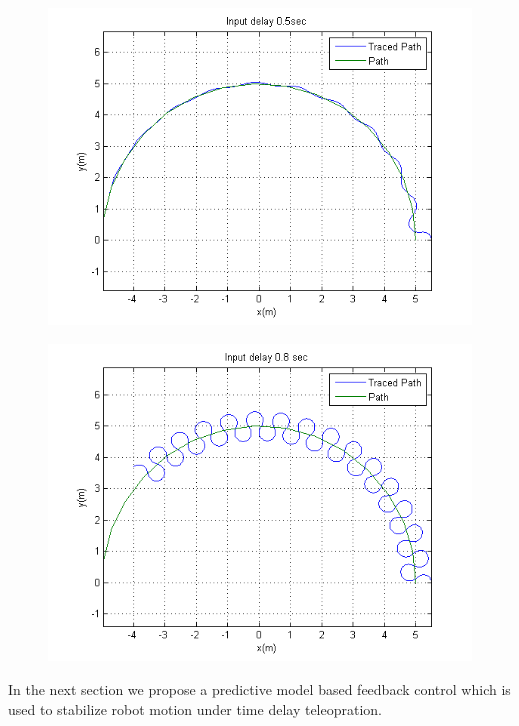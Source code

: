 \begin{figure}[h]
	\includegraphics[width=\linewidth,keepaspectratio]{Chapter6/fig/Delay500milsec}
	\label{fig:delay500plot} 
\end{figure} 
\begin{figure}[h]
	\includegraphics[width=\linewidth,keepaspectratio]{Chapter6/fig/Delay800milsec}
	\label{fig:delay800plot} 
\end{figure} 




 

 In the next section we propose a predictive model based feedback control which is used to stabilize robot motion  under time delay teleopration.

